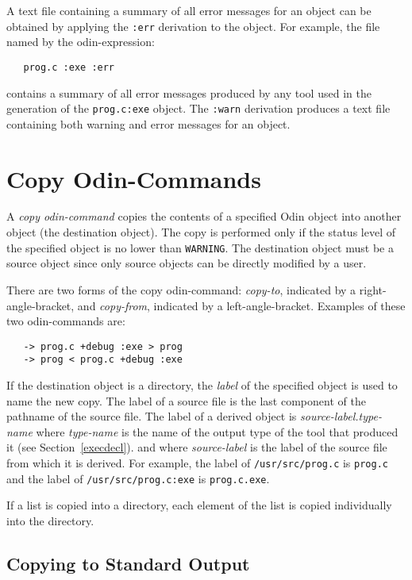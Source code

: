 \documentclass[hidelinks]{report}
\newcommand{\ex}{\tt}   %
\begin{document}
A text file containing a summary of all error messages for an object
can be obtained by applying the {\ex :err} derivation to the object.
For example, the file named by the odin-expression:
\begin{verbatim}
   prog.c :exe :err
\end{verbatim}
contains a summary of all error messages 
produced by any tool used in the generation of the {\ex prog.c:exe} object.
The {\ex :warn} derivation produces a text file containing both
warning and error messages for an object.


\section{Copy Odin-Commands}
\label{copy}

A {\em copy odin-command} copies the contents of a specified Odin object
into another object (the destination object).
The copy is performed only if the status level
of the specified object is no lower than {\ex WARNING}.
The destination object must be a source object
since only source objects can be directly modified by a user.

There are two forms of the copy odin-command:
{\em copy-to}, indicated by a right-angle-bracket, and
{\em copy-from}, indicated by a left-angle-bracket.
Examples of these two odin-commands are:
\begin{verbatim}
   -> prog.c +debug :exe > prog
   -> prog < prog.c +debug :exe
\end{verbatim}

If the destination object is a directory,
the {\em label} of the specified object is used to name the new copy.
The label of a source file is
the last component of the pathname of the source file.
The label of a derived object is {\em source-label.type-name}
where {\em type-name} is the name of the output type
of the tool that produced it (see Section~\ref{execdecl}).
and where {\em source-label} is the label of the source file
from which it is derived.
For example, the label of {\ex /usr/src/prog.c} is {\ex prog.c} and
the label of {\ex /usr/src/prog.c:exe} is {\ex prog.c.exe}.

If a list is copied into a directory,
each element of the list is copied individually into the directory.

\subsection{Copying to Standard Output}
\end{document}
